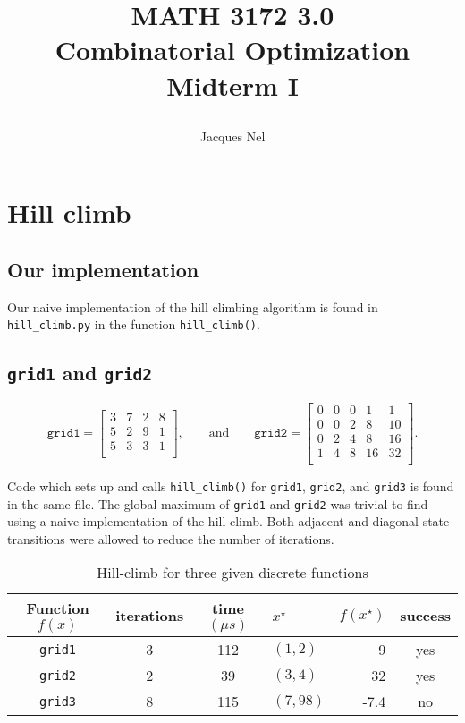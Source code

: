 \documentclass[11pt,oneside]{article}
\title{{\bf MATH 3172 3.0\\ Combinatorial Optimization}\\\vspace{10pt} \large Midterm I     
    \author{Jacques Nel}
}
\begin{document}
\maketitle

\section{Hill climb}

\subsection{Our implementation}

Our naive implementation of the hill climbing algorithm is found in
\texttt{hill\_climb.py} in the function \texttt{hill\_climb()}.

\subsection{\texttt{grid1} and \texttt{grid2}}

$$
\mathtt{grid1}=
\begin{bmatrix}
    3 & 7 & 2 & 8 \\
    5 & 2 & 9 & 1 \\
    5 & 3 & 3 & 1 \\
\end{bmatrix},
\quad\quad\text{and}\quad\quad
\mathtt{grid2}=
\begin{bmatrix}
    0 & 0 & 0 & 1 & 1 \\
    0 & 0 & 2 & 8 & 10 \\
    0 & 2 & 4 & 8 & 16 \\
    1 & 4 & 8 & 16 & 32 \\
\end{bmatrix}.
$$

Code which sets up and calls \texttt{hill\_climb()} for \texttt{grid1},
\texttt{grid2}, and \texttt{grid3} is found in the same file. The global maximum of \texttt{grid1} and \texttt{grid2} was trivial to find using
a naive implementation of the hill-climb. Both adjacent and diagonal state
transitions were allowed to reduce the number of iterations.

\begin{table}[h]
    \centering
    \caption{Hill-climb for three given discrete functions}
\begin{tabular}{c|cclr|c}
    Function $f(x)$ & iterations & time $(\mu s)$ & $x^\star$ & $f(x^\star)$ & success \\
    \hline
    \texttt{grid1} & 3 & 112 & $(1,2)$ & 9 & yes \\
    \texttt{grid2} & 2 & 39 & $(3,4)$ & 32 & yes \\
    \texttt{grid3} & 8 & 115 & $(7,98)$ & -7.4 & no \\
\end{tabular}
\end{table}
\end{document}
